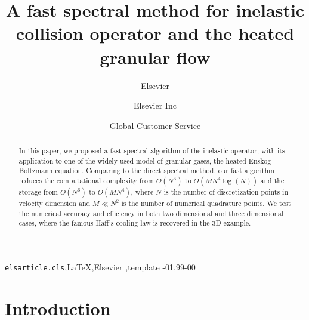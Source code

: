 \documentclass[review, times]{elsarticle}
\begin{document}
\begin{frontmatter}

\title{A fast spectral method for inelastic collision operator and the heated granular flow}

\author{Elsevier}
\address{Radarweg 29, Amsterdam}

\author[mymainaddress,mysecondaryaddress]{Elsevier Inc}

\author[mysecondaryaddress]{Global Customer Service}

\address[mymainaddress]{1600 John F Kennedy Boulevard, Philadelphia}
\address[mysecondaryaddress]{360 Park Avenue South, New York}

\begin{abstract}
In this paper, we proposed a fast spectral algorithm of the inelastic operator, with its application to one of the widely used model of granular gases, the heated Enskog-Boltzmann equation. Comparing to the direct spectral method, our fast algorithm reduces the computational complexity from $O\left(N^6\right)$ to $O\left(MN^4\log(N) \right)$ and the storage from $O(N^6)$ to $O\left( MN^4\right)$, where $N$ is the number of discretization points in velocity dimension and $M \ll N^2$ is the number of numerical quadrature points. We test the numerical accuracy and efficiency in both two dimensional and three dimensional cases, where the famous Haff's cooling law is recovered in the 3D example.
\end{abstract}

\begin{keyword}
\texttt{elsarticle.cls}\sep \LaTeX\sep Elsevier \sep template
-01\sep  99-00
\end{keyword}

\end{frontmatter}

\linenumbers

\section{Introduction}
\end{document}
